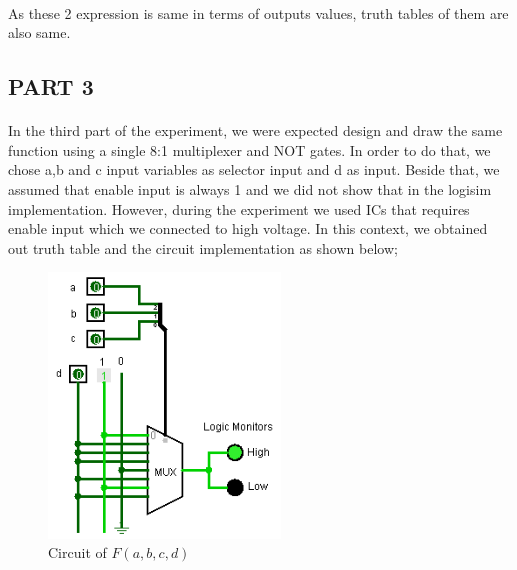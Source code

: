 \documentclass[pdftex,12pt,a4paper]{article}
\begin{document}
\paragraph{}
As these 2 expression is same in terms of outputs values, truth tables of them are also same.
\clearpage
\subsection{PART 3}

\paragraph{}
In the third part of the experiment, we were expected design and draw the same function using a single 8:1 multiplexer and NOT gates. In order to do that, we chose a,b and c input variables as selector input and d as input. Beside that, we assumed that enable input is always 1 and we did not show that in the logisim implementation. However, during the experiment we used ICs that requires enable input which we connected to high voltage. In this context, we obtained out truth table and the circuit implementation as shown below;
\newline
\newline

\begin{figure}[!h]
	\centering
	\includegraphics[width=0.55\textwidth]{part3.png}	
	\caption{Circuit of $F(a,b,c,d)$}
	\label{log3}
\end{figure}


\clearpage
\end{document}
